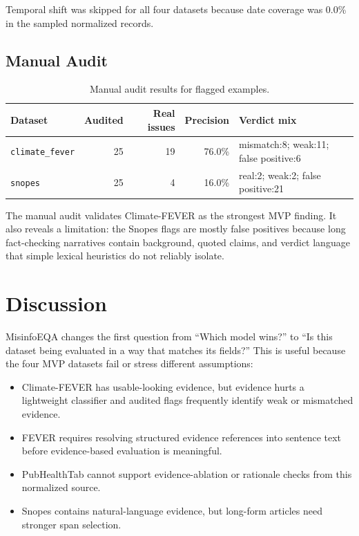 \documentclass[11pt]{article}
\begin{document}
Temporal shift was skipped for all four datasets because date coverage was
0.0\% in the sampled normalized records.

\subsection{Manual Audit}

\begin{table}[h]
\centering
\small
\begin{tabular}{lrrrl}
\toprule
Dataset & Audited & Real issues & Precision & Verdict mix \\
\midrule
\texttt{climate\_fever} & 25 & 19 & 76.0\% & mismatch:8; weak:11; false positive:6 \\
\texttt{snopes} & 25 & 4 & 16.0\% & real:2; weak:2; false positive:21 \\
\bottomrule
\end{tabular}
\caption{Manual audit results for flagged examples.}
\label{tab:audit}
\end{table}

The manual audit validates Climate-FEVER as the strongest MVP finding. It also
reveals a limitation: the Snopes flags are mostly false positives because long
fact-checking narratives contain background, quoted claims, and verdict language
that simple lexical heuristics do not reliably isolate.

\section{Discussion}

MisinfoEQA changes the first question from ``Which model wins?'' to ``Is this
dataset being evaluated in a way that matches its fields?'' This is useful
because the four MVP datasets fail or stress different assumptions:

\begin{itemize}
  \item Climate-FEVER has usable-looking evidence, but evidence hurts a
  lightweight classifier and audited flags frequently identify weak or mismatched
  evidence.
  \item FEVER requires resolving structured evidence references into sentence
  text before evidence-based evaluation is meaningful.
  \item PubHealthTab cannot support evidence-ablation or rationale checks from
  this normalized source.
  \item Snopes contains natural-language evidence, but long-form articles need
  stronger span selection.
\end{itemize}
\end{document}
